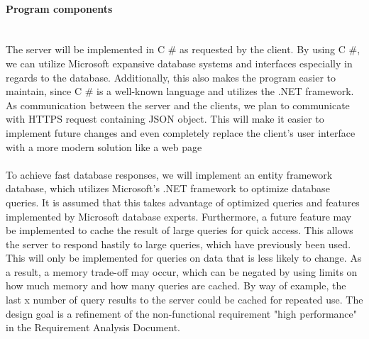 \paragraph{Program components}\mbox{}\\
The server will be implemented in C \# as requested by the client. By using C \#, we can utilize Microsoft expansive database systems and interfaces especially in regards to the database. Additionally, this also makes the program easier to maintain, since C \# is a well-known language and utilizes the .NET framework. As communication between the server and the clients, we plan to communicate with HTTPS  request containing JSON object. This will make it easier to implement future changes and even completely replace the client's user interface with a more modern solution like a web page
\\\\
To achieve fast database responses, we will implement an entity framework database, which utilizes Microsoft's .NET framework to optimize database queries. It is assumed that this takes advantage of optimized queries and features implemented by Microsoft database experts. Furthermore, a future feature may be implemented to cache the result of large queries for quick access. This allows the server to respond hastily to large queries, which have previously been used. This will only be implemented for queries on data that is less likely to change. As a result, a memory trade-off may occur, which can be negated by using limits on how much memory and how many queries are cached. By way of example, the last x number of query results to the server could be cached for repeated use. The design goal is a refinement of the non-functional requirement "high performance" in the Requirement Analysis Document.